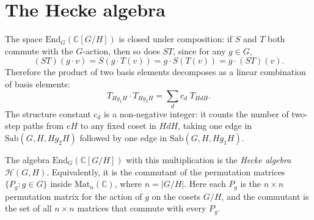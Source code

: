 \documentclass[12pt]{article}
\begin{document}
\section{The Hecke algebra}

The space $\mathrm{End}_G(\mathbb{C}[G/H])$ is closed under composition: if $S$ and $T$ both commute with the $G$-action, then so does $ST$, since for any $g \in G$,
\[
(ST)(g \cdot v) = S(g \cdot T(v)) = g \cdot S(T(v)) = g \cdot (ST)(v).
\]
Therefore the product of two basis elements decomposes as a linear combination of basis elements:
\[
T_{Hg_1H} \cdot T_{Hg_2H} = \sum_{d} c_d \; T_{HdH}.
\]
The structure constant $c_d$ is a non-negative integer: it counts the number of two-step paths from $eH$ to any fixed coset in $HdH$, taking one edge in $\mathrm{Sab}(G, H, Hg_2H)$ followed by one edge in $\mathrm{Sab}(G, H, Hg_1H)$.

The algebra $\mathrm{End}_G(\mathbb{C}[G/H])$ with this multiplication is the \emph{Hecke algebra} $\mathcal{H}(G,H)$. Equivalently, it is the commutant of the permutation matrices $\{P_g : g \in G\}$ inside $\mathrm{Mat}_n(\mathbb{C})$, where $n = |G/H|$. Here each $P_g$ is the $n \times n$ permutation matrix for the action of $g$ on the cosets $G/H$, and the commutant is the set of all $n \times n$ matrices that commute with every $P_g$.
\end{document}
